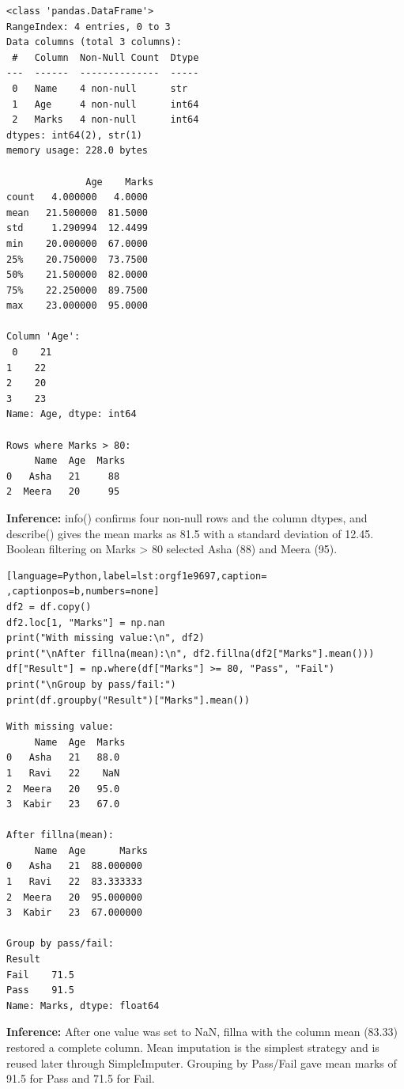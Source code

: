 \documentclass[11pt]{article}
\begin{document}
\begin{verbatim}
<class 'pandas.DataFrame'>
RangeIndex: 4 entries, 0 to 3
Data columns (total 3 columns):
 #   Column  Non-Null Count  Dtype
---  ------  --------------  -----
 0   Name    4 non-null      str  
 1   Age     4 non-null      int64
 2   Marks   4 non-null      int64
dtypes: int64(2), str(1)
memory usage: 228.0 bytes

              Age    Marks
count   4.000000   4.0000
mean   21.500000  81.5000
std     1.290994  12.4499
min    20.000000  67.0000
25%    20.750000  73.7500
50%    21.500000  82.0000
75%    22.250000  89.7500
max    23.000000  95.0000

Column 'Age':
 0    21
1    22
2    20
3    23
Name: Age, dtype: int64

Rows where Marks > 80:
     Name  Age  Marks
0   Asha   21     88
2  Meera   20     95
\end{verbatim}

\textbf{Inference:} info() confirms four non-null rows and the column dtypes, and describe() gives the mean
marks as 81.5 with a standard deviation of 12.45. Boolean filtering on Marks > 80 selected
Asha (88) and Meera (95).
\begin{lstlisting}[language=Python,label=lst:orgf1e9697,caption= ,captionpos=b,numbers=none]
df2 = df.copy()
df2.loc[1, "Marks"] = np.nan
print("With missing value:\n", df2)
print("\nAfter fillna(mean):\n", df2.fillna(df2["Marks"].mean()))
df["Result"] = np.where(df["Marks"] >= 80, "Pass", "Fail")
print("\nGroup by pass/fail:")
print(df.groupby("Result")["Marks"].mean())
\end{lstlisting}

\begin{verbatim}
With missing value:
     Name  Age  Marks
0   Asha   21   88.0
1   Ravi   22    NaN
2  Meera   20   95.0
3  Kabir   23   67.0

After fillna(mean):
     Name  Age      Marks
0   Asha   21  88.000000
1   Ravi   22  83.333333
2  Meera   20  95.000000
3  Kabir   23  67.000000

Group by pass/fail:
Result
Fail    71.5
Pass    91.5
Name: Marks, dtype: float64
\end{verbatim}

\textbf{Inference:} After one value was set to NaN, fillna with the column mean (83.33) restored a complete
column. Mean imputation is the simplest strategy and is reused later through SimpleImputer.
Grouping by Pass/Fail gave mean marks of 91.5 for Pass and 71.5 for Fail.
\end{document}

